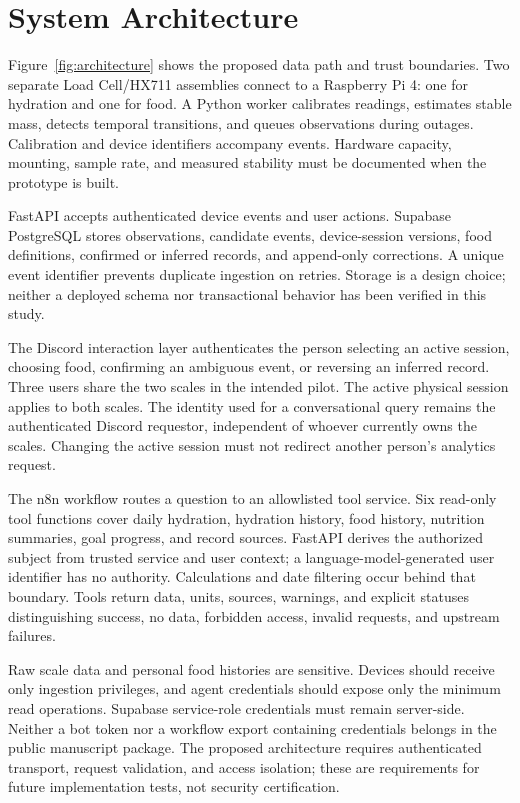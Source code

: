 \section{System Architecture}\label{sec:architecture}
Figure~\ref{fig:architecture} shows the proposed data path and trust boundaries. Two separate Load Cell/HX711 assemblies connect to a Raspberry Pi 4: one for hydration and one for food. A Python worker calibrates readings, estimates stable mass, detects temporal transitions, and queues observations during outages. Calibration and device identifiers accompany events. Hardware capacity, mounting, sample rate, and measured stability must be documented when the prototype is built.



FastAPI accepts authenticated device events and user actions. Supabase PostgreSQL stores observations, candidate events, device-session versions, food definitions, confirmed or inferred records, and append-only corrections. A unique event identifier prevents duplicate ingestion on retries. Storage is a design choice; neither a deployed schema nor transactional behavior has been verified in this study.

The Discord interaction layer authenticates the person selecting an active session, choosing food, confirming an ambiguous event, or reversing an inferred record. Three users share the two scales in the intended pilot. The active physical session applies to both scales. The identity used for a conversational query remains the authenticated Discord requestor, independent of whoever currently owns the scales. Changing the active session must not redirect another person's analytics request.

The n8n workflow routes a question to an allowlisted tool service. Six read-only tool functions cover daily hydration, hydration history, food history, nutrition summaries, goal progress, and record sources. FastAPI derives the authorized subject from trusted service and user context; a language-model-generated user identifier has no authority. Calculations and date filtering occur behind that boundary. Tools return data, units, sources, warnings, and explicit statuses distinguishing success, no data, forbidden access, invalid requests, and upstream failures.

Raw scale data and personal food histories are sensitive. Devices should receive only ingestion privileges, and agent credentials should expose only the minimum read operations. Supabase service-role credentials must remain server-side. Neither a bot token nor a workflow export containing credentials belongs in the public manuscript package. The proposed architecture requires authenticated transport, request validation, and access isolation; these are requirements for future implementation tests, not security certification.

